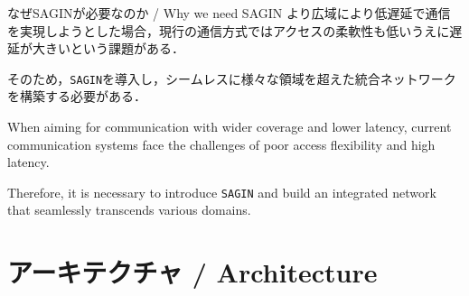\documentclass[11pt, aspectratio=169]{beamer}
\begin{document}
\begin{frame}{なぜSAGINが必要なのか / Why we need SAGIN}
  より広域により低遅延で通信を実現しようとした場合，現行の通信方式ではアクセスの柔軟性も低いうえに遅延が大きいという課題がある．

  そのため，\texttt{SAGIN}を導入し，シームレスに様々な領域を超えた統合ネットワークを構築する必要がある．

  \vspace{1cm}

  When aiming for communication with wider coverage and lower latency, current communication systems face the challenges of poor access flexibility and high latency.

  Therefore, it is necessary to introduce \texttt{SAGIN} and build an integrated network that seamlessly transcends various domains.
\end{frame}

\section{アーキテクチャ / Architecture}
\end{document}
